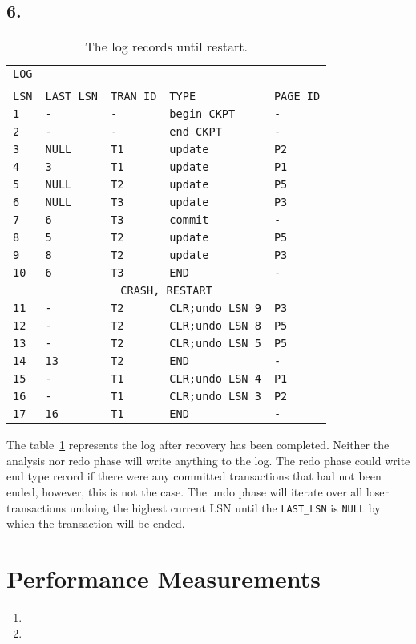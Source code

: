 \documentclass[a4paper]{article}
\begin{document}
\subsection*{6.}
\begin{table}[H]
\begin{tabular*}{\textwidth}{@{\extracolsep{\fill}}lllll}
\texttt{LOG}&&&& \\
&&&&\\
\texttt{LSN} & \texttt{LAST\_LSN} & \texttt{TRAN\_ID} & \texttt{TYPE} & \texttt{PAGE\_ID} \\
\texttt{1} & \texttt{-} & \texttt{-} & \texttt{begin CKPT} & \texttt{-} \\
\texttt{2} & \texttt{-} & \texttt{-} & \texttt{end CKPT} & \texttt{-} \\
\texttt{3} & \texttt{NULL} & \texttt{T1} & \texttt{update} & \texttt{P2} \\
\texttt{4} & \texttt{3} &\texttt{T1} & \texttt{update} & \texttt{P1} \\
\texttt{5} & \texttt{NULL} & \texttt{T2} & \texttt{update} & \texttt{P5} \\
\texttt{6} & \texttt{NULL} & \texttt{T3} & \texttt{update} & \texttt{P3} \\
\texttt{7} & \texttt{6} & \texttt{T3} & \texttt{commit} & \texttt{-} \\
\texttt{8} & \texttt{5} & \texttt{T2} & \texttt{update} & \texttt{P5} \\
\texttt{9} & \texttt{8} & \texttt{T2} & \texttt{update} & \texttt{P3} \\
\texttt{10} & \texttt{6} & \texttt{T3} & \texttt{END} & \texttt{-} \\
\multicolumn{5}{c}{\texttt{CRASH, RESTART}}\\
\texttt{11} & \texttt{-} & \texttt{T2} & \texttt{CLR;undo LSN 9} & \texttt{P3} \\
\texttt{12} & \texttt{-} & \texttt{T2} & \texttt{CLR;undo LSN 8} & \texttt{P5} \\
\texttt{13} & \texttt{-} & \texttt{T2} & \texttt{CLR;undo LSN 5} & \texttt{P5} \\
\texttt{14} & \texttt{13} &\texttt{T2} & \texttt{END} & \texttt{-} \\
\texttt{15} & \texttt{-} & \texttt{T1} & \texttt{CLR;undo LSN 4} & \texttt{P1} \\
\texttt{16} & \texttt{-} & \texttt{T1} & \texttt{CLR;undo LSN 3} & \texttt{P2} \\
\texttt{17} & \texttt{16} & \texttt{T1} & \texttt{END} & \texttt{-} \\
\end{tabular*}
\caption{The log records until restart.}
\label{crs}
\end{table}
The table~\ref{crs} represents the log after recovery has been completed. Neither the analysis nor redo phase will write anything to the log. The redo phase could write end type record if there were any committed transactions that had not been ended, however, this is not the case. The undo phase will iterate over all loser transactions undoing the highest current LSN until the \texttt{LAST\_LSN} is \texttt{NULL} by which the transaction will be ended.
\section{Performance Measurements}
\begin{enumerate}
\item
\item
\end{enumerate}
\end{document}
